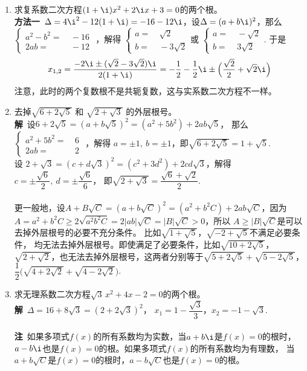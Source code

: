 \begin{enumerate}[label={【\textbf{例\thechapter.\arabic*}】},
 leftmargin=\inteval{\myenumleftmargin}pt,
 itemsep=\inteval{\myenumitempsep}pt,
 itemindent=\inteval{\myenumitemindent}pt]
\item 求复系数二次方程$ (1+\i)x^2+2\i x+3=0 $的两个根。\\
\textbf{方法一}\ $ \Delta=4\i^2-12(1+\i)=-16-12\i $，设$ \Delta=(a+b\i)^2 $，那么
$ \left\{ \begin{aligned}
    a^2-b^2 =&\ -16 \\
    2ab =&\ -12
\end{aligned} \right. $ ，解得
$ \left\{ \begin{aligned}
    a=&\ \sqrt{2} \\
    b=&\ -3\sqrt{2}
\end{aligned} \right. $或
$ \left\{ \begin{aligned}
    a=&\ -\sqrt{2} \\
    b=&\ 3\sqrt{2}
\end{aligned} \right. $. 
于是
\begin{gather*}
    x_{1,2}=\dfrac{-2\i\pm (\sqrt{2}-3\sqrt{2})\i}{2(1+\i)}=-\dfrac{1}{2}
    -\dfrac{1}{2}\i\pm \Big(\dfrac{\sqrt{2}}{2}+\sqrt{2} \i\Big)
\end{gather*}
注意，此时的两个复数根不是共轭复数，这与实系数二次方程不一样。

\item 去掉$ \sqrt{6+2\sqrt{5}} $ 和 $ \sqrt{2+\sqrt{3}} $ 
的外层根号。\\
\textbf{解}\ 设$ 6+2\sqrt{5}=(a+b\sqrt{5})^2=(a^2+5b^2)+2ab\sqrt{5}$，
那么
$ \left\{ \begin{aligned}
    a^2+5b^2 =&\ 6 \\
    2ab =&\ 2
\end{aligned} \right. $ ，解得
$ a=\pm 1,\ b=\pm 1 $，即$ \sqrt{6+2\sqrt{5}}=1+\sqrt{5} $. \\
设 $ 2+\sqrt{3}=(c+d\sqrt{3})^2=(c^2+3d^2)+
2cd\sqrt{3} $，解得$ c=\pm \dfrac{\sqrt{6}}{2},\ d=\pm \dfrac{\sqrt{6}}{6} $，
即$  \sqrt{2+\sqrt{3}} = \dfrac{\sqrt{6}+\sqrt{2}}{2} $.  \\
\\
更一般地，设$ A+B\sqrt{C}=(a+b\sqrt{C})^2=(a^2+b^2C)+2ab\sqrt{C} $，因为
$ A=a^2+b^2C \geq 2\sqrt{a^2b^2C} =2|ab|\sqrt{C}=|B|\sqrt{C}>0 $，所以
$ A\geq |B|\sqrt{C} $是可以去掉外层根号的必要不充分条件。
比如$ \sqrt{1+\sqrt{5}} $，$ \sqrt{-2+\sqrt{5}} $不满足必要条件，
均无法去掉外层根号。即使满足了必要条件，比如$ \sqrt{10+2\sqrt{5}} $，
$ \sqrt{2+\sqrt{2}} $，也无法去掉外层根号，这两者分别等于$ \sqrt{5+2\sqrt{5}}+
\sqrt{5-2\sqrt{5}} $，$ \dfrac{1}{2}\bigl(\sqrt{4+2\sqrt{2}}+
\sqrt{4-2\sqrt{2}}\bigr) $. 

\item 求无理系数二次方程$ \sqrt{3}\, x^2+4x-2=0 $的两个根。\\
\textbf{解}\ $ \Delta=16+8\sqrt{3}=(2+2\sqrt{3})^2 $，
$ x_1=1-\dfrac{\sqrt{3}}{3} $，$ x_2=-1-\sqrt{3} $. \\
\\
\textbf{注}\ 如果多项式$ f(x) $的所有系数均为实数，当$ a+b\i $是$ f(x)=0 $的根时，
$ a-b\i $也是$ f(x)=0 $的根。如果多项式$ f(x) $的所有系数均为有理数，
当$ a+b\sqrt{C} $是$ f(x)=0 $的根时，$ a-b\sqrt{C} $也是$ f(x)=0 $的根。


\end{enumerate}
